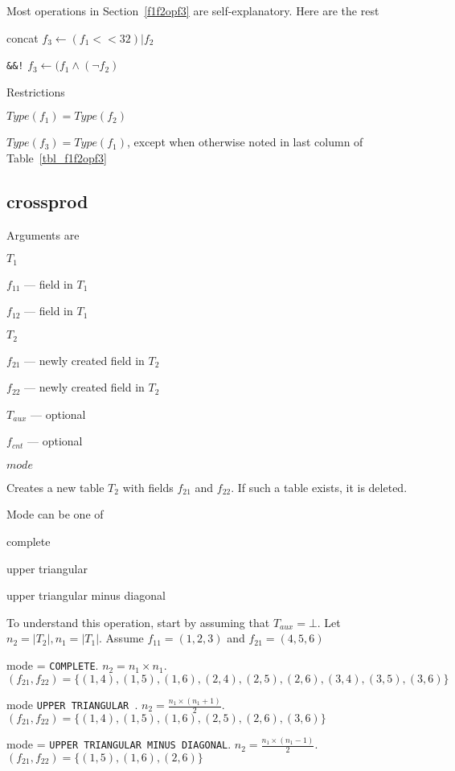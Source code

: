 \documentclass{report}
\begin{document}
Most operations in Section~\ref{f1f2opf3} are self-explanatory. Here are
the rest
\be
\item concat \(f_3 \leftarrow (f_1 << 32) | f_2 \)
\item \verb+&&!+ \(f_3 \leftarrow (f_1 \wedge (\neg f_2) \)
  \ee

Restrictions
\be
\item \(Type(f_1) = Type(f_2)\)
\item \(Type(f_3) = Type(f_1)\), except when otherwise noted in last
column of Table~\ref{tbl_f1f2opf3}
\ee

\subsection{crossprod}
\label{crossprod}

Arguments are 
\be
\item \(T_1\)
\item \(f_{11}\) --- field in \(T_1\) 
\item \(f_{12}\) --- field in \(T_1\) 
\item \(T_2\)
\item \(f_{21}\) --- newly created field in \(T_2\) 
\item \(f_{22}\) --- newly created field in \(T_2\) 
\item \(T_{aux}\) --- optional 
\item \(f_{cnt}\) --- optional 
\item \(mode\)
\ee

Creates a new table \(T_2\) with fields \(f_{21}\) and \(f_{22}\).  
If such a table exists, it is deleted. 

Mode can be one of
\be
\item complete
\item upper triangular 
\item upper triangular minus diagonal
\ee

To understand this operation, start by assuming that \(T_{aux} = \bot\).
Let \(n_2 = |T_2|, n_1 = |T_1|\). 
Assume \(f_{11} = (1, 2, 3)\)
and    \(f_{21} = (4, 5, 6)\)
\be
\item mode = {\tt COMPLETE}. 
\(n_2 = n_1 \times n_1\). 
\((f_{21}, f_{22}) = \{
(1,4), (1, 5), (1, 6), 
(2,4), (2, 5), (2, 6), 
(3,4), (3, 5), (3, 6)\}
\)
\item mode {\tt UPPER TRIANGULAR }. 
\(n_2 = \frac{n_1 \times (n_1+1)}{2}\).
\((f_{21}, f_{22}) = \{
(1,4), (1, 5), (1, 6), 
       (2, 5), (2, 6), 
               (3, 6)\}
\)
\item mode = {\tt UPPER TRIANGULAR MINUS DIAGONAL}. 
\(n_2 = \frac{n_1 \times (n_1-1)}{2}\).
\((f_{21}, f_{22}) = \{
       (1, 5), (1, 6), 
               (2, 6)
                     \}
\)
  \ee
\end{document}
